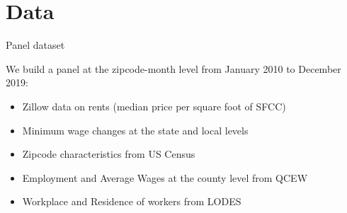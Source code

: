 \documentclass[ignorenonframetext,aspectratio=169]{beamer}
\providecommand{\tightlist}{%
  \setlength{\itemsep}{0pt}\setlength{\parskip}{0pt}}
\begin{document}
\hypertarget{data}{%
\section{Data}\label{data}}

\begin{frame}{Panel dataset}
\protect\hypertarget{panel-dataset}{}

We build a panel at the zipcode-month level from January 2010 to
December 2019:

\begin{itemize}
\tightlist
\item
  Zillow data on rents (median price per square foot of SFCC)
\item
  Minimum wage changes at the state and local levels
\item
  Zipcode characteristics from US Census
\item
  Employment and Average Wages at the county level from QCEW
\item
  Workplace and Residence of workers from LODES
\end{itemize}

\end{frame}
\end{document}
